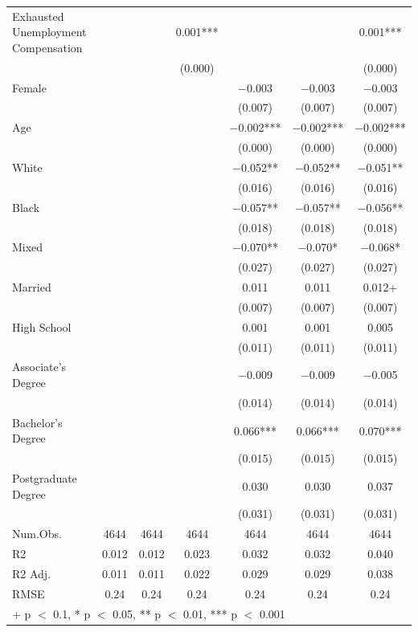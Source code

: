 \documentclass[
]{article}
\begin{document}
\begin{table}
{\begin{tabular}[t]{lcccccc}
Exhausted
Unemployment
Compensation &  &  & \num{0.001}*** &  &  & \num{0.001}***\\
 &  &  & (\num{0.000}) &  &  & (\num{0.000})\\
Female &  &  &  & \num{-0.003} & \num{-0.003} & \num{-0.003}\\
 &  &  &  & (\num{0.007}) & (\num{0.007}) & \vphantom{1} (\num{0.007})\\
Age &  &  &  & \num{-0.002}*** & \num{-0.002}*** & \num{-0.002}***\\
 &  &  &  & (\num{0.000}) & (\num{0.000}) & (\num{0.000})\\
White &  &  &  & \num{-0.052}** & \num{-0.052}** & \num{-0.051}**\\
 &  &  &  & (\num{0.016}) & (\num{0.016}) & (\num{0.016})\\
Black &  &  &  & \num{-0.057}** & \num{-0.057}** & \num{-0.056}**\\
 &  &  &  & (\num{0.018}) & (\num{0.018}) & (\num{0.018})\\
Mixed &  &  &  & \num{-0.070}** & \num{-0.070}* & \num{-0.068}*\\
 &  &  &  & (\num{0.027}) & (\num{0.027}) & (\num{0.027})\\
Married &  &  &  & \num{0.011} & \num{0.011} & \num{0.012}+\\
 &  &  &  & (\num{0.007}) & (\num{0.007}) & (\num{0.007})\\
High
School &  &  &  & \num{0.001} & \num{0.001} & \num{0.005}\\
 &  &  &  & (\num{0.011}) & (\num{0.011}) & (\num{0.011})\\
Associate's
Degree &  &  &  & \num{-0.009} & \num{-0.009} & \num{-0.005}\\
 &  &  &  & (\num{0.014}) & (\num{0.014}) & (\num{0.014})\\
Bachelor's
Degree &  &  &  & \num{0.066}*** & \num{0.066}*** & \num{0.070}***\\
 &  &  &  & (\num{0.015}) & (\num{0.015}) & (\num{0.015})\\
Postgraduate
Degree &  &  &  & \num{0.030} & \num{0.030} & \num{0.037}\\
 &  &  &  & (\num{0.031}) & (\num{0.031}) & (\num{0.031})\\
\midrule
Num.Obs. & \num{4644} & \num{4644} & \num{4644} & \num{4644} & \num{4644} & \num{4644}\\
R2 & \num{0.012} & \num{0.012} & \num{0.023} & \num{0.032} & \num{0.032} & \num{0.040}\\
R2 Adj. & \num{0.011} & \num{0.011} & \num{0.022} & \num{0.029} & \num{0.029} & \num{0.038}\\
RMSE & \num{0.24} & \num{0.24} & \num{0.24} & \num{0.24} & \num{0.24} & \num{0.24}\\
\bottomrule
\multicolumn{7}{l}{\rule{0pt}{1em}+ p $<$ 0.1, * p $<$ 0.05, ** p $<$ 0.01, *** p $<$ 0.001}\\
\end{tabular}}
\end{table}
\end{document}

